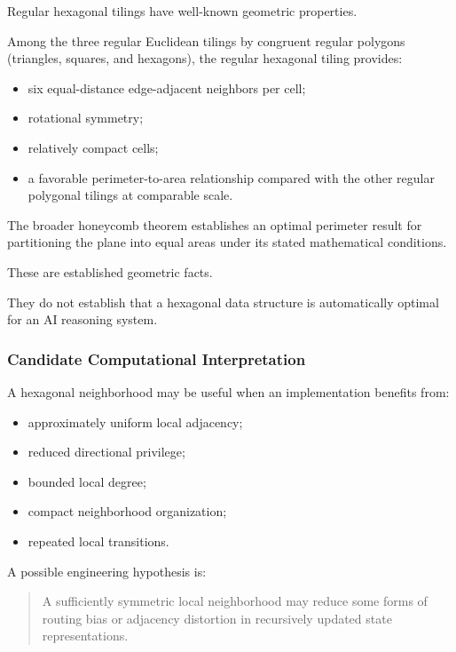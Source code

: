 Regular hexagonal tilings have well-known geometric properties.

Among the three regular Euclidean tilings by congruent regular polygons
(triangles, squares, and hexagons), the regular hexagonal tiling provides:

\begin{itemize}
    \item six equal-distance edge-adjacent neighbors per cell;
    \item rotational symmetry;
    \item relatively compact cells;
    \item a favorable perimeter-to-area relationship compared with the other
          regular polygonal tilings at comparable scale.
\end{itemize}

The broader honeycomb theorem establishes an optimal perimeter result for
partitioning the plane into equal areas under its stated mathematical
conditions.

These are established geometric facts.

They do not establish that a hexagonal data structure is automatically optimal
for an AI reasoning system.

\subsubsection*{Candidate Computational Interpretation}

A hexagonal neighborhood may be useful when an implementation benefits from:

\begin{itemize}
    \item approximately uniform local adjacency;
    \item reduced directional privilege;
    \item bounded local degree;
    \item compact neighborhood organization;
    \item repeated local transitions.
\end{itemize}

A possible engineering hypothesis is:

\begin{quote}
A sufficiently symmetric local neighborhood may reduce some forms of routing
bias or adjacency distortion in recursively updated state representations.
\end{quote}

